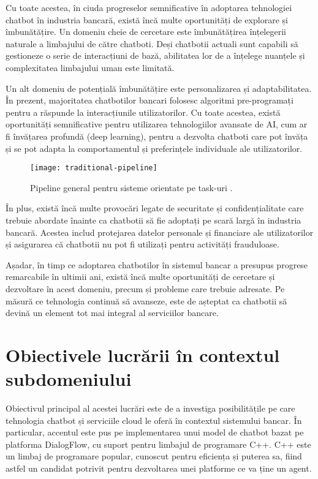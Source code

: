 Cu toate acestea, în ciuda progreselor semnificative în adoptarea tehnologiei chatbot în industria bancară, există încă multe oportunități de explorare și îmbunătățire. Un domeniu cheie de cercetare este îmbunătățirea înțelegerii naturale a limbajului de către chatboti. Deși chatbotii actuali sunt capabili să gestioneze o serie de interacțiuni de bază, abilitatea lor de a înțelege nuanțele și complexitatea limbajului uman este limitată.

Un alt domeniu de potențială îmbunătățire este personalizarea și adaptabilitatea. În prezent, majoritatea chatbotilor bancari folosesc algoritmi pre-programați pentru a răspunde la interacțiunile utilizatorilor. Cu toate acestea, există oportunități semnificative pentru utilizarea tehnologiilor avansate de AI, cum ar fi învățarea profundă (deep learning), pentru a dezvolta chatboti care pot învăța și se pot adapta la comportamentul și preferințele individuale ale utilizatorilor.

\begin{figure}[h] %
    \centering
    \texttt{[image: traditional-pipeline]}
    \caption{Pipeline general pentru sisteme orientate pe task-uri \cite{chen_liu_yin_tang_dialogue_2017}.}
    \label{fig:traditional-pipeline}
\end{figure}

În plus, există încă multe provocări legate de securitate și confidențialitate care trebuie abordate înainte ca chatbotii să fie adoptați pe scară largă în industria bancară. Acestea includ protejarea datelor personale și financiare ale utilizatorilor și asigurarea că chatbotii nu pot fi utilizați pentru activități frauduloase.

Așadar, în timp ce adoptarea chatbotilor în sistemul bancar a presupus progrese remarcabile în ultimii ani, există încă multe oportunități de cercetare și dezvoltare în acest domeniu, precum și probleme care trebuie adresate. Pe măsură ce tehnologia continuă să avanseze, este de așteptat ca chatbotii să devină un element tot mai integral al serviciilor bancare.

\section{Obiectivele lucrării în contextul subdomeniului}

Obiectivul principal al acestei lucrări este de a investiga posibilitățile pe care tehnologia chatbot și serviciile cloud le oferă în contextul sistemului bancar. În particular, accentul este pus pe implementarea unui model de chatbot bazat pe platforma DialogFlow, cu suport pentru limbajul de programare C++. C++ este un limbaj de programare popular, cunoscut pentru eficiența și puterea sa, fiind astfel un candidat potrivit pentru dezvoltarea unei platforme ce va ține un agent.

